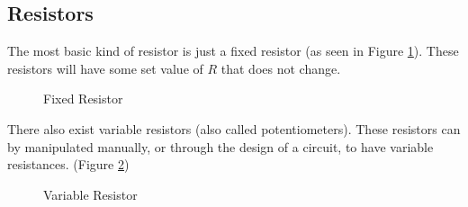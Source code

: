 \documentclass[12pt]{article}
\begin{document}
\subsection{Resistors}
\label{ssec:resistors}

The most basic kind of resistor is just a fixed resistor (as seen in Figure \ref{fig:024}). These resistors will have some set value of $R$ that does not change.

\begin{figure}[H]
  \centering
  
  \caption{Fixed Resistor}
  \label{fig:024}
\end{figure}

There also exist variable resistors (also called potentiometers). These resistors can by manipulated manually, or through the design of a circuit, to have variable resistances. (Figure \ref{fig:025})

\begin{figure}[H]
  \centering
  
  \caption{Variable Resistor}
  \label{fig:025}
\end{figure}
\end{document}
